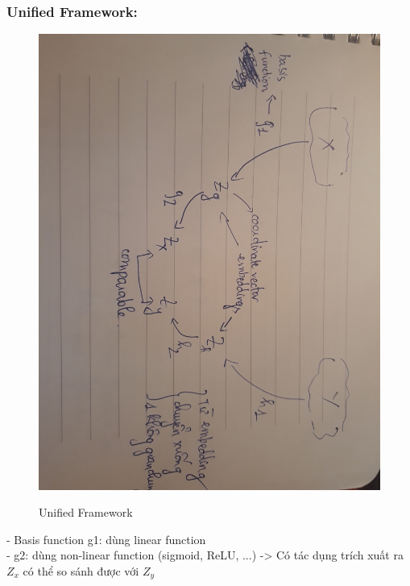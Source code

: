 \documentclass{article}
\begin{document}
\subsubsection{Unified Framework:}
\begin{figure}[ht]

\begin{center}

\includegraphics[scale=0.1]{20190703_001236}\\

\end{center}

\caption{Unified Framework}

\end{figure}

- Basis function g1: dùng linear function \\
- g2: dùng non-linear function (sigmoid, ReLU, ...) -> Có tác dụng trích xuất ra $Z_x$ có thể so sánh được với $Z_y$\\
\end{document}
